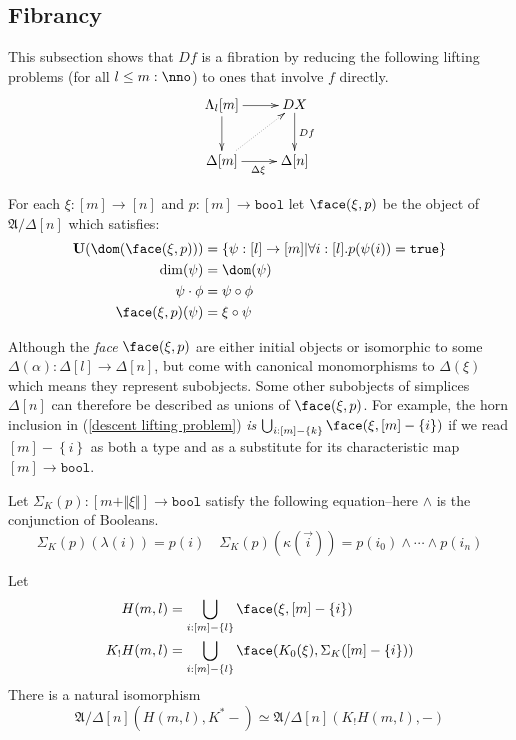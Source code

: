 \documentclass{tac}
\newcommand\set[1]{\left\{#1\right\}}
\newcommand\ri{^*}
\newcommand\of{:}
\newcommand\simplex\Delta
\newcommand\horn\Lambda
\newcommand\true{\mathtt{true}}
\newcommand\bool{\mathtt{bool}}
\newcommand\norm[1]{\Vert #1 \Vert}
\newcommand\ka\kappa
\newcommand\la\lambda
\newcommand\depsum{\Sigma_}
\newcommand\ambient{\mathfrak A}
\begin{document}
\subsection{Fibrancy}
This subsection shows that $Df$ is a fibration by reducing the following lifting problems (for all $l\leq m\of\nno$) to ones that involve $f$ directly.
\begin{equation}
	\xymatrix{
		\horn_l[m]\ar[r]\ar[d] & DX\ar[d]^{Df} \\
		\simplex[m]\ar[r]_{\Delta\xi} \ar@{.>}[ur] & \simplex[n]
	}
	\label{descent lifting problem}
\end{equation}


\begin{definition} For each $\xi\of[m]\to[n]$ and $p\of[m]\to\bool$ let $\face(\xi,p)$ be the object of $\ambient/\simplex[n]$ which satisfies: 
\begin{align*}
\base(\dom(\face(\xi,p))) &= \set{\psi\of[l]\to[m]| \forall i\of[l].p(\psi(i))=\true}\\
\dim(\psi) &= \dom(\psi) \\
\psi\cdot\phi &= \psi\circ\phi\\
\face(\xi,p)(\psi) &= \xi\circ\psi
\end{align*}
\end{definition}

Although the \emph{face} $\face(\xi,p)$ are either initial objects or isomorphic to some $\simplex(\alpha)\of\simplex[l]\to\simplex[n]$, but come with canonical monomorphisms to $\simplex(\xi)$ which means they represent subobjects. Some other subobjects of simplices $\simplex[n]$ can therefore be described as unions of $\face(\xi,p)$. For example, the horn inclusion in (\ref{descent lifting problem}) \emph{is} $\bigcup_{i\of [m]-\set k} \face(\xi,[m]-\set i)$ if we read $[m]-\set i$ as both a type and as a substitute for its characteristic map $[m]\to\bool$.


\begin{proposition}
Let $\depsum K(p)\of [m+\norm\xi]\to \bool$ satisfy the following equation--here $\mathord\land$ is the conjunction of Booleans.
\[ \depsum K(p)(\la(i))=p(i)\quad\depsum K(p)(\ka(\vec i)) = p(i_0)\land\dotsm\land p(i_n) \] 

Let \begin{align*}
H(m,l)&=\bigcup_{i\of [m]-\set l} \face(\xi,[m]-\set i)\\
K_!H(m,l)&=\bigcup_{i\of [m]-\set l} \face(K_0(\xi),\depsum K([m]-\set i))
\end{align*}
There is a natural isomorphism \[ \ambient/\simplex[n](H(m,l),K\ri -) \simeq \ambient/\simplex[n](K_!H(m,l),-) \] \label{K-universal}
\end{proposition}
\end{document}
